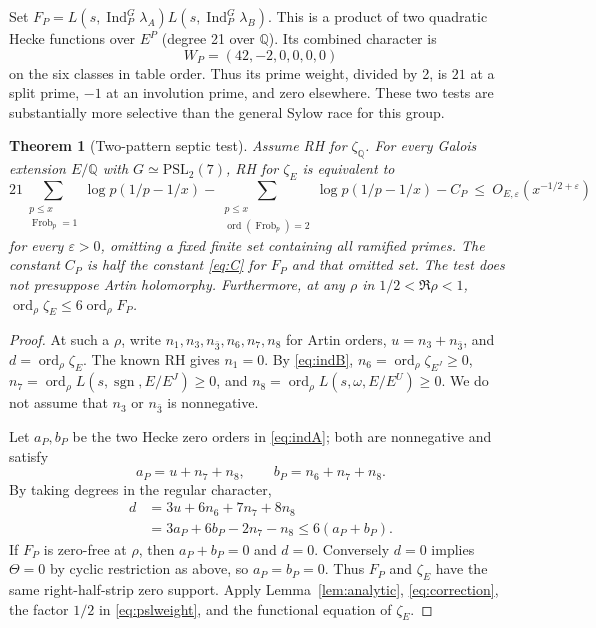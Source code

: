 \documentclass[11pt]{article}
\newtheorem{theorem}{Theorem}
\theoremstyle{remark}\newtheorem{remark}[theorem]{Remark}
\newcommand{\Q}{\mathbb Q}
\newcommand{\ord}{\operatorname{ord}}
\newcommand{\Ind}{\operatorname{Ind}}
\newcommand{\Frob}{\operatorname{Frob}}
\begin{document}
Set $F_P=L(s,\Ind_P^G\lambda_A)L(s,\Ind_P^G\lambda_B)$. This is a product of two quadratic Hecke functions over $E^P$ (degree 21 over $\Q$). Its combined character is
\begin{equation}\label{eq:pslweight}
 W_P=(42,-2,0,0,0,0)
\end{equation}
on the six classes in table order. Thus its prime weight, divided by 2, is $21$ at a split prime, $-1$ at an involution prime, and zero elsewhere. These two tests are substantially more selective than the general Sylow race for this group.

\begin{theorem}[Two-pattern septic test]\label{thm:psl}
Assume RH for $\zeta_{\Q}$. For every Galois extension $E/\Q$ with $G\simeq\mathrm{PSL}_2(7)$, RH for $\zeta_E$ is equivalent to
\begin{equation}\label{eq:psltest}
 21\sum_{\substack{p\le x\\\Frob_p=1}}\log p(1/p-1/x)
 -\sum_{\substack{p\le x\\\ord(\Frob_p)=2}}\log p(1/p-1/x)
 -C_P\ \le\ O_{E,\varepsilon}(x^{-1/2+\varepsilon})
\end{equation}
for every $\varepsilon>0$, omitting a fixed finite set containing all ramified primes. The constant $C_P$ is half the constant \eqref{eq:C} for $F_P$ and that omitted set. The test does not presuppose Artin holomorphy. Furthermore, at any $\rho$ in $1/2<\Re\rho<1$, $\ord_\rho\zeta_E\le 6\ord_\rho F_P$.
\end{theorem}
\begin{proof}
At such a $\rho$, write $n_1,n_3,n_{\bar3},n_6,n_7,n_8$ for Artin orders, $u=n_3+n_{\bar3}$, and $d=\ord_\rho\zeta_E$. The known RH gives $n_1=0$. By \eqref{eq:indB}, $n_6=\ord_\rho\zeta_{E^J}\ge0$, $n_7=\ord_\rho L(s,\operatorname{sgn},E/E^J)\ge0$, and $n_8=\ord_\rho L(s,\omega,E/E^U)\ge0$. We do not assume that $n_3$ or $n_{\bar3}$ is nonnegative.

Let $a_P,b_P$ be the two Hecke zero orders in \eqref{eq:indA}; both are nonnegative and satisfy
\[ a_P=u+n_7+n_8,\qquad b_P=n_6+n_7+n_8.\]
By taking degrees in the regular character,
\begin{align*}
 d&=3u+6n_6+7n_7+8n_8\\
  &=3a_P+6b_P-2n_7-n_8\le 6(a_P+b_P).
\end{align*}
If $F_P$ is zero-free at $\rho$, then $a_P+b_P=0$ and $d=0$. Conversely $d=0$ implies $\Theta=0$ by cyclic restriction as above, so $a_P=b_P=0$. Thus $F_P$ and $\zeta_E$ have the same right-half-strip zero support. Apply Lemma~\ref{lem:analytic}, \eqref{eq:correction}, the factor $1/2$ in \eqref{eq:pslweight}, and the functional equation of $\zeta_E$.
\end{proof}
\end{document}
